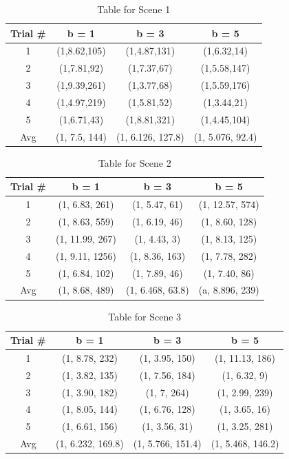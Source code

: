 \documentclass{article}
\begin{document}
\begin{table}
  \centering
\begin{tabular}{|c|c|c|c|}
  \hline
  Trial \# & b = 1 & b = 3 & b = 5 \\
  \hline
  1 & (1,8.62,105) & (1,4.87,131) & (1,6.32,14) \\
  2 & (1,7.81,92) & (1,7.37,67) & (1,5.58,147) \\
  3 & (1,9.39,261) & (1,3.77,68) & (1,5.59,176) \\
  4 & (1,4.97,219) & (1,5.81,52) & (1,3.44,21) \\
  5 & (1,6.71,43) & (1,8.81,321) & (1,4.45,104) \\
  Avg & (1, 7.5, 144) & (1, 6.126, 127.8) & (1, 5.076, 92.4)\\
  \hline
\end{tabular} 
\caption{Table for Scene 1}
  \label{tab:mytable}
\end{table}

\begin{table}
  \centering
\begin{tabular}{|c|c|c|c|}
  \hline
  Trial \# & b = 1 & b = 3 & b = 5 \\
  \hline
  1 & (1, 6.83, 261) & (1, 5.47, 61) & (1, 12.57, 574) \\
  2 & (1, 8.63, 559) & (1, 6.19, 46) & (1, 8.60, 128) \\
  3 & (1, 11.99, 267) & (1, 4.43, 3) & (1, 8.13, 125) \\
  4 & (1, 9.11, 1256) & (1, 8.36, 163) & (1, 7.78, 282) \\
  5 & (1, 6.84, 102) & (1, 7.89, 46) & (1, 7.40, 86) \\
  Avg & (1, 8.68, 489) & (1, 6.468, 63.8) & (a, 8.896, 239) \\
  \hline
\end{tabular} 
\caption{Table for Scene 2}
  \label{tab:mytable}
\end{table}

\begin{table}
  \centering
\begin{tabular}{|c|c|c|c|}
  \hline
  Trial \# & b = 1 & b = 3 & b = 5 \\
  \hline
  1 & (1, 8.78, 232) & (1, 3.95, 150) & (1, 11.13, 186) \\
  2 & (1, 3.82, 135) & (1, 7.56, 184) & (1, 6.32, 9) \\
  3 & (1, 3.90, 182) & (1, 7, 264) & (1, 2.99, 239) \\
  4 & (1, 8.05, 144) & (1, 6.76, 128) & (1, 3.65, 16) \\
  5 & (1, 6.61, 156) & (1, 3.56, 31) & (1, 3.25, 281) \\
  Avg & (1, 6.232, 169.8) & (1, 5.766, 151.4) & (1, 5.468, 146.2) \\
  \hline
\end{tabular} 
\caption{Table for Scene 3}
  \label{tab:mytable}
\end{table}
\end{document}
